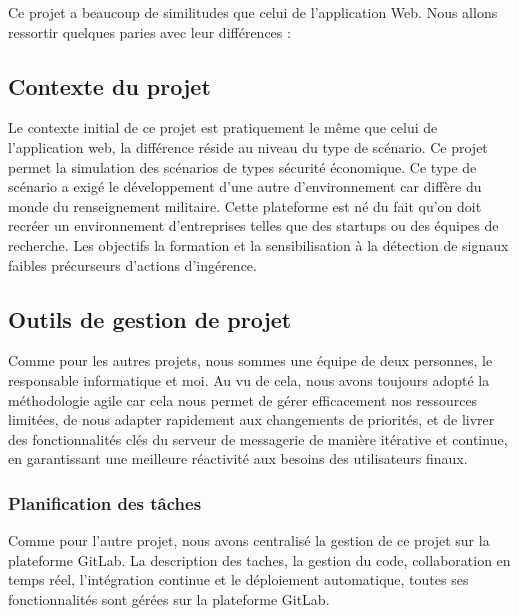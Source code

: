 Ce projet a beaucoup de similitudes que celui de l'application Web. Nous allons ressortir quelques paries avec leur différences :


\subsection{Contexte du projet}
Le contexte initial de ce projet est pratiquement le même que celui de l'application web, la différence réside au niveau du type de scénario.
Ce projet permet la simulation des scénarios de types sécurité économique.
Ce type de scénario a exigé le développement d'une autre d'environnement car diffère du monde du renseignement militaire.
Cette plateforme est né du fait qu'on doit recréer un environnement d’entreprises telles que des startups ou des équipes de recherche.
Les objectifs la formation et la sensibilisation à la détection de signaux faibles précurseurs d’actions d’ingérence.


\subsection{Outils de gestion de projet}
Comme pour les autres projets, nous sommes une équipe de deux personnes, le responsable informatique et moi. Au vu de cela, nous avons toujours adopté la méthodologie agile car cela nous permet de gérer efficacement nos ressources limitées, de nous adapter rapidement aux changements de priorités, et de livrer des fonctionnalités clés du serveur de messagerie de manière itérative et continue, en garantissant une meilleure réactivité aux besoins des utilisateurs finaux.


\subsubsection{Planification des tâches}
Comme pour l'autre projet, nous avons centralisé la gestion de ce projet sur la plateforme GitLab.
La description des taches, la gestion du code, collaboration en temps réel, l’intégration continue et le déploiement automatique, toutes ses fonctionnalités sont gérées sur la plateforme GitLab.



